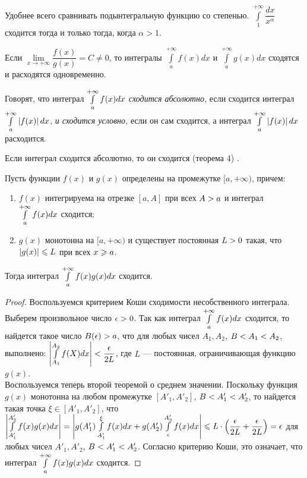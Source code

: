 \documentclass[a4paper,10pt]{article}
\begin{document}
	\begin{note}
		Удобнее всего сравнивать подынтегральную функцию со степенью. $\int\limits_1^{+\infty}\dfrac{dx}{x^\alpha}$ сходится тогда и только тогда, когда $\alpha>1$.
	\end{note}

	\begin{cor}
		Если $\lim\limits_{x\to+\infty}\dfrac{f(x)}{g(x)}=C\ne0$, то интегралы $\int\limits_a^{+\infty}f(x)dx$ и $\int\limits_a^{+\infty}g(x)dx$ сходятся и расходятся одновременно.
	\end{cor}
	
	\begin{defn}
		Говорят, что интеграл $\mathop{\int}\limits^{+ \infty}_a f(x)dx$
		 \textit{сходится абсолютно,} если сходится интеграл
		 $\mathop{\int}\limits^{+ \infty}_a \left| f(x) \right| dx$,
		 \textit{и сходится условно,} если он сам сходится, а
		 интеграл $\mathop{\int}\limits^{+ \infty}_a \left| f(x) \right| dx$ расходится.
	\end{defn}
	
	\begin{note}
		Если интеграл сходится абсолютно, то он сходится %
		(теорема 4)%
		.
	\end{note}
	
	\begin{nthm} \label{thm5}
		Пусть функции $f(x)$ и
		 $g(x)$ определены на промежутке $[a, + \infty)$, причем:
		 \begin{enumerate}
		 	\item $f(x)$ интегрируема на отрезке $[a, A]$ при всех $A \hm{>} a$ и интеграл $\mathop{\int}\limits^{+ \infty}_a f(x)dx$ сходится;
		 	\item $g(x)$ монотонна на $[a, + \infty)$ и существует постоянная $L \hm{>} 0$ такая, что $\left| g(x) \right| \hm{\le} L$ при всех $x \hm{\ge} a$.
		 \end{enumerate}
		 Тогда интеграл $\mathop{\int}\limits^{+ \infty}_a f(x)g(x)dx$ сходится.
	\end{nthm}
	\begin{proof}
		Воспользуемся критерием Коши сходимости несобственного интеграла.
		 Выберем произвольное число $\epsilon \hm{>} 0$. Так как интеграл
		 $\mathop{\int}\limits^{+ \infty}_a f(x)dx$ сходится, то найдется такое число
		 $B(\epsilon) \hm{>} a$, что для любых чисел $A_1, A_2$, $B \hm{<} A_1 \hm{<} A_2$,
		 выполнено: $\left| \intl^{A_2}_{A_1} f(X)dx \right| \hm{<} \dfrac{\epsilon}{2L}$,
		 где $L$ --- постоянная, ограничивающая функцию $g(x)$. \\
		 Воспользуемся теперь второй теоремой о среднем значении. Поскольку
		 функция $g(x)$ монотонна на любом промежутке $[A'_1, A'_2]$,
		 $B \hm{<} A'_1 \hm{<} A'_2$, то найдется такая точка $\xi \in [A'_1, A'_2]$,
		 что $\left| \intl^{A'_2}_{A'_1} f(x)g(x)dx \right| \hm{=} \left| g(A'_1)
		 \intl^{\xi}_{A'_1} f(x)dx + g(A'_2) \intl^{A'_2}_{\epsilon} f(x)dx \right|
		 \hm{\le} L\cdot\left(\dfrac{\epsilon}{2L} + \dfrac{\epsilon}{2L}\right) \hm{=} \epsilon$ для
		 любых чисел $A'_1, A'_2$, $B \hm{<} A'_1 \hm{<} A'_2$. Согласно критерию Коши,
		 это означает, что интеграл $\mathop{\int}\limits^{+ \infty}_a f(x)g(x)dx$ сходится.
	\end{proof}
	
\end{document}
